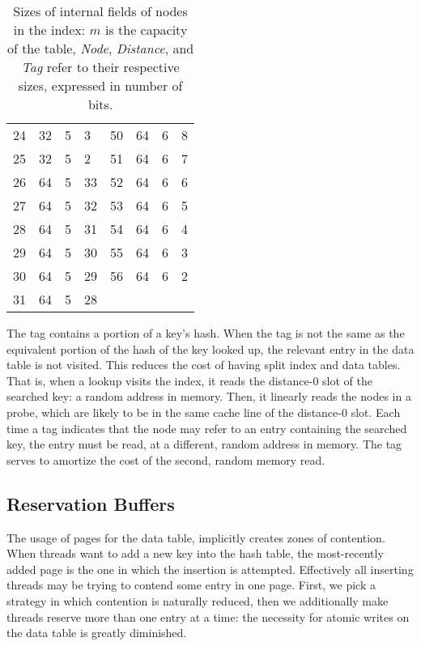 \begin{table}
\begin{tabular}{llll|llll}
                  24       & 32   & 5        & 3   & 50       & 64   & 6        & 8   \\
                  25       & 32   & 5        & 2   & 51       & 64   & 6        & 7   \\
                  26       & 64   & 5        & 33  & 52       & 64   & 6        & 6   \\
                  27       & 64   & 5        & 32  & 53       & 64   & 6        & 5   \\
                  28       & 64   & 5        & 31  & 54       & 64   & 6        & 4   \\
                  29       & 64   & 5        & 30  & 55       & 64   & 6        & 3   \\
                  30       & 64   & 5        & 29  & 56       & 64   & 6        & 2   \\
                  31 & 64 & 5 & 28 & \\
    \end{tabular}
    \caption{Sizes of internal fields of nodes in the index: $m$ is the capacity of the table, \emph{Node}, \emph{Distance}, and \emph{Tag} refer to their respective sizes, expressed in number of bits.}
    \label{tab:nodes}
\end{table}

The tag contains a portion of a key's hash.
When the tag is not the same as the equivalent portion of the hash of the key looked up, the relevant entry in the data table is not visited.
This reduces the cost of having split index and data tables.
That is, when a lookup visits the index, it reads the distance-0 slot of the searched key: a random address in memory.
Then, it linearly reads the nodes in a probe, which are likely to be in the same cache line of the distance-0 slot.
Each time a tag indicates that the node may refer to an entry containing the searched key, the entry must be read, at a different, random address in memory.
The tag serves to amortize the cost of the second, random memory read.

\subsection{Reservation Buffers}\label{subsec:reservation-buffers}

The usage of pages for the data table, implicitly creates zones of contention.
When threads want to add a new key into the hash table, the most-recently added page is the one in which the insertion is attempted.
Effectively all inserting threads may be trying to contend some entry in one page.
First, we pick a strategy in which contention is naturally reduced, then we additionally make threads reserve more than one entry at a time: the necessity for atomic writes on the data table is greatly diminished.

